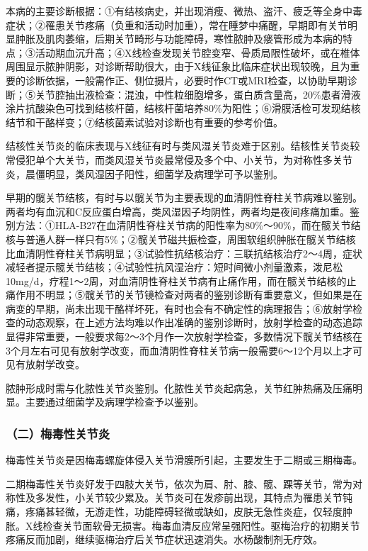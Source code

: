 本病的主要诊断根据：①有结核病史，并出现消瘦、微热、盗汗、疲乏等全身中毒症状；②罹患关节疼痛（负重和活动时加重），常在睡梦中痛醒，早期即有关节明显肿胀及肌肉萎缩，后期关节畸形与功能障碍，寒性脓肿及瘘管形成为本病的特点；③活动期血沉升高；④X线检查发现关节腔变窄、骨质局限性破坏，或在椎体周围显示脓肿阴影，对诊断帮助很大，由于X线征象比临床症状出现较晚，且为重要的诊断依据，一般需作正、侧位摄片，必要时作CT或MRI检查，以协助早期诊断；⑤关节腔抽出液检查：混浊，中性粒细胞增多，蛋白质含量高，20\%患者滑液涂片抗酸染色可找到结核杆菌，结核杆菌培养80\%为阳性；⑥滑膜活检可发现结核结节和干酪样变；⑦结核菌素试验对诊断也有重要的参考价值。

结核性关节炎的临床表现与X线征有时与类风湿关节炎难于区别。结核性关节炎较常侵犯单个大关节，而类风湿关节炎最常侵及多个中、小关节，为对称性多关节炎，晨僵明显，类风湿因子阳性，细菌学及病理学可予以鉴别。

早期的髋关节结核，有时与以髋关节为主要表现的血清阴性脊柱关节病难以鉴别。两者均有血沉和C反应蛋白增高，类风湿因子均阴性，两者均是夜间疼痛加重。鉴别方法：①HLA-B27在血清阴性脊柱关节病的阳性率为80\%～90\%，而在髋关节结核与普通人群一样只有5\%；②髋关节磁共振检查，周围软组织肿胀在髋关节结核比血清阴性脊柱关节病明显；③试验性抗结核治疗：三联抗结核治疗2～4周，症状减轻者提示髋关节结核；④试验性抗风湿治疗：短时间微小剂量激素，泼尼松10mg/d，疗程1～2周，对血清阴性脊柱关节病有止痛作用，而在髋关节结核的止痛作用不明显；⑤髋关节的关节镜检查对两者的鉴别诊断有重要意义，但如果是在病变的早期，尚未出现干酪样坏死，有时也会有不确定性的病理报告；⑥放射学检查的动态观察，在上述方法均难以作出准确的鉴别诊断时，放射学检查的动态追踪显得非常重要，一般要求每2～3个月作一次放射学检查，多数情况下髋关节结核在3个月左右可见有放射学改变，而血清阴性脊柱关节病一般需要6～12个月以上才可见有放射学改变。

脓肿形成时需与化脓性关节炎鉴别。化脓性关节炎起病急，关节红肿热痛及压痛明显。主要通过细菌学及病理学检查予以鉴别。

\subsubsection{（二）梅毒性关节炎}

梅毒性关节炎是因梅毒螺旋体侵入关节滑膜所引起，主要发生于二期或三期梅毒。

二期梅毒性关节炎好发于四肢大关节，依次为肩、肘、膝、髋、踝等关节，常为对称性及多发性，小关节较少累及。关节炎可在发疹前出现，其特点为罹患关节钝痛，疼痛甚轻微，无游走性，功能障碍轻微或缺如，皮肤无急性炎症，仅轻度肿胀。X线检查关节面软骨无损害。梅毒血清反应常呈强阳性。驱梅治疗的初期关节疼痛反而加剧，继续驱梅治疗后关节症状迅速消失。水杨酸制剂无疗效。

